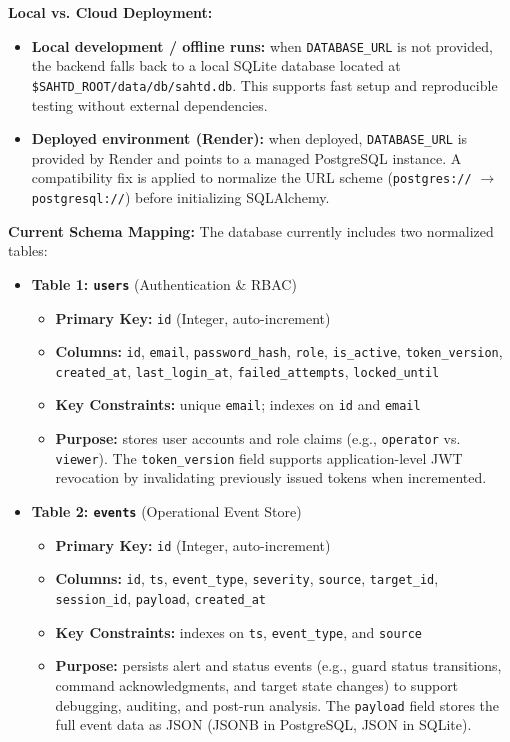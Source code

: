 \documentclass[12pt,a4paper]{report}
\begin{document}
\textbf{Local vs. Cloud Deployment:}
\begin{itemize}
    \item \textbf{Local development / offline runs:} when \texttt{DATABASE\_URL} is not provided, the backend falls back to a local SQLite database located at \texttt{\$SAHTD\_ROOT/data/db/sahtd.db}. This supports fast setup and reproducible testing without external dependencies.
    \item \textbf{Deployed environment (Render):} when deployed, \texttt{DATABASE\_URL} is provided by Render and points to a managed PostgreSQL instance. A compatibility fix is applied to normalize the URL scheme (\texttt{postgres://} $\rightarrow$ \texttt{postgresql://}) before initializing SQLAlchemy.
\end{itemize}

\textbf{Current Schema Mapping:}
The database currently includes two normalized tables:

\begin{itemize}
    \item \textbf{Table 1: \texttt{users}} (Authentication \& RBAC)
    \begin{itemize}
        \item \textbf{Primary Key:} \texttt{id} (Integer, auto-increment)
        \item \textbf{Columns:} \texttt{id}, \texttt{email}, \texttt{password\_hash}, \texttt{role}, \texttt{is\_active}, \texttt{token\_version}, \texttt{created\_at}, \texttt{last\_login\_at}, \texttt{failed\_attempts}, \texttt{locked\_until}
        \item \textbf{Key Constraints:} unique \texttt{email}; indexes on \texttt{id} and \texttt{email}
        \item \textbf{Purpose:} stores user accounts and role claims (e.g., \texttt{operator} vs. \texttt{viewer}). The \texttt{token\_version} field supports application-level JWT revocation by invalidating previously issued tokens when incremented.
    \end{itemize}

    \item \textbf{Table 2: \texttt{events}} (Operational Event Store)
    \begin{itemize}
        \item \textbf{Primary Key:} \texttt{id} (Integer, auto-increment)
        \item \textbf{Columns:} \texttt{id}, \texttt{ts}, \texttt{event\_type}, \texttt{severity}, \texttt{source}, \texttt{target\_id}, \texttt{session\_id}, \texttt{payload}, \texttt{created\_at}
        \item \textbf{Key Constraints:} indexes on \texttt{ts}, \texttt{event\_type}, and \texttt{source}
        \item \textbf{Purpose:} persists alert and status events (e.g., guard status transitions, command acknowledgments, and target state changes) to support debugging, auditing, and post-run analysis. The \texttt{payload} field stores the full event data as JSON (JSONB in PostgreSQL, JSON in SQLite).
    \end{itemize}
\end{itemize}
\end{document}
